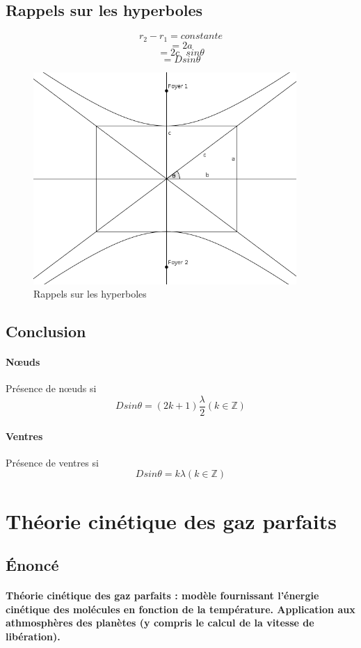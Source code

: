 \documentclass[a4paper]{article}
\begin{document}
\subsection{Rappels sur les hyperboles}
\[r_2-r_1=constante\]
\[=2a\]
\[=2c\text{ }sin\theta\]
\[=Dsin\theta\]
\begin{figure}
\begin{center}
\includegraphics[width=10cm]{imgs/hyperbole.png}
\end{center}
\caption{Rappels sur les hyperboles}
\label{Rappels sur les hyperboles}
\end{figure}
\subsection{Conclusion}
\paragraph{Nœuds}Présence de nœuds si
\[Dsin\theta=(2k+1)\frac{\lambda}{2} (k \in \mathbb{Z})\]
\paragraph{Ventres}Présence de ventres si
\[Dsin\theta=k\lambda (k \in \mathbb{Z})\]
\section{Théorie cinétique des gaz parfaits}
\subsection{Énoncé}
\paragraph{}\textbf{Théorie cinétique des gaz parfaits : modèle fournissant l'énergie cinétique des molécules en fonction de la température. Application aux athmosphères des planètes (y compris le calcul de la vitesse de libération).}
\end{document}
